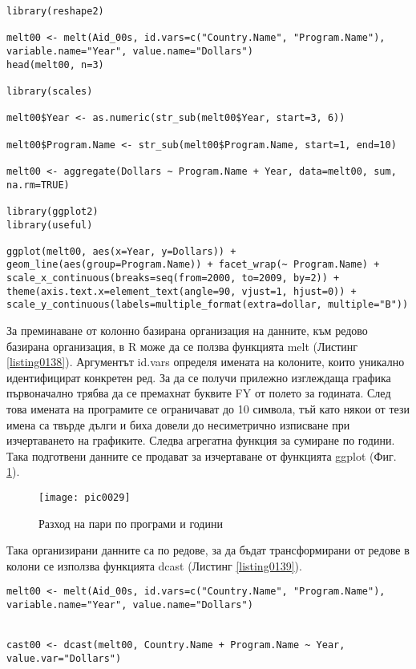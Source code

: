 \begin{lstlisting}[caption=От колони към редове, label=listing0138]
library(reshape2)

melt00 <- melt(Aid_00s, id.vars=c("Country.Name", "Program.Name"), variable.name="Year", value.name="Dollars")
head(melt00, n=3)

library(scales)

melt00$Year <- as.numeric(str_sub(melt00$Year, start=3, 6))

melt00$Program.Name <- str_sub(melt00$Program.Name, start=1, end=10)

melt00 <- aggregate(Dollars ~ Program.Name + Year, data=melt00, sum, na.rm=TRUE)

library(ggplot2)
library(useful)

ggplot(melt00, aes(x=Year, y=Dollars)) + geom_line(aes(group=Program.Name)) + facet_wrap(~ Program.Name) + scale_x_continuous(breaks=seq(from=2000, to=2009, by=2)) + theme(axis.text.x=element_text(angle=90, vjust=1, hjust=0)) + scale_y_continuous(labels=multiple_format(extra=dollar, multiple="B"))
\end{lstlisting}

За преминаване от колонно базирана организация на данните, към редово базирана организация, в R може да се ползва функцията melt (Листинг \ref{listing0138}). Аргументът id.vars определя имената на колоните, които уникално идентифицират конкретен ред. За да се получи прилежно изглеждаща графика първоначално трябва да се премахнат буквите FY от полето за годината. След това имената на програмите се ограничават до 10 символа, тъй като някои от тези имена са твърде дълги и биха довели до несиметрично изписване при изчертаването на графиките. Следва агрегатна функция за сумиране по години. Така подготвени данните се продават за изчертаване от функцията ggplot (Фиг. \ref{figure0029}).

\begin{figure}[h!]
  \centering
  \texttt{[image: pic0029]}
  \caption{Разход на пари по програми и години}
\label{figure0029}
\end{figure}
\FloatBarrier

Така организирани данните са по редове, за да бъдат трансформирани от редове в колони се използва функцията dcast (Листинг \ref{listing0139}). 

\begin{lstlisting}[caption=От редове към колони, label=listing0139]
melt00 <- melt(Aid_00s, id.vars=c("Country.Name", "Program.Name"), variable.name="Year", value.name="Dollars")
 
 
cast00 <- dcast(melt00, Country.Name + Program.Name ~ Year, value.var="Dollars")
\end{lstlisting}

